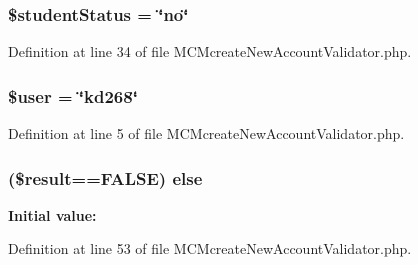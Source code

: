 \hypertarget{_m_c_mcreate_new_account_validator_8php_a2a584da3ccd0ef43368c316e3bb177df}{
\subsubsection[{\$student\-Status}]{\setlength{\rightskip}{0pt plus 5cm}\$student\-Status = \char`\"{}no\char`\"{}}}\label{_m_c_mcreate_new_account_validator_8php_a2a584da3ccd0ef43368c316e3bb177df}


Definition at line 34 of file M\-C\-Mcreate\-New\-Account\-Validator.\-php.

\hypertarget{_m_c_mcreate_new_account_validator_8php_a598ca4e71b15a1313ec95f0df1027ca5}{
\subsubsection[{\$user}]{\setlength{\rightskip}{0pt plus 5cm}\$user = \char`\"{}kd268\char`\"{}}}\label{_m_c_mcreate_new_account_validator_8php_a598ca4e71b15a1313ec95f0df1027ca5}


Definition at line 5 of file M\-C\-Mcreate\-New\-Account\-Validator.\-php.

\hypertarget{_m_c_mcreate_new_account_validator_8php_a6b5f81c8ab2d615e3528311678d7870f}{
\subsubsection[{else}]{ (\$result==F\-A\-L\-S\-E) else}}\label{_m_c_mcreate_new_account_validator_8php_a6b5f81c8ab2d615e3528311678d7870f}
{\bfseries Initial value\-:}


Definition at line 53 of file M\-C\-Mcreate\-New\-Account\-Validator.\-php.

